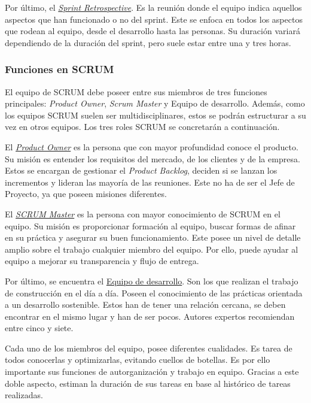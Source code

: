 Por último, el \underline{\textit{Sprint Retrospective}}. Es la reunión donde el equipo indica aquellos aspectos que han funcionado o no del sprint. Este se enfoca en todos los aspectos que rodean al equipo, desde el desarrollo hasta las personas. Su duración variará dependiendo de la duración del sprint, pero suele estar entre una y tres horas.

\subsubsection{Funciones en SCRUM}
El equipo de SCRUM debe poseer entre sus miembros de tres funciones principales: \textit{Product Owner}, \textit{Scrum Master} y Equipo de desarrollo. Además, como los equipos SCRUM suelen ser multidisciplinares, estos se podrán estructurar a su vez en otros equipos. Los tres roles SCRUM se concretarán a continuación.

El \underline{\textit{Product Owner}} es la persona que con mayor profundidad conoce el producto. Su misión es entender los requisitos del mercado, de los clientes y de la empresa. Estos se encargan de gestionar el \textit{Product Backlog}, deciden si se lanzan los incrementos y lideran las mayoría de las reuniones. Este no ha de ser el Jefe de Proyecto, ya que poseen misiones diferentes.

El \underline{\textit{SCRUM Master}} es la persona con mayor conocimiento de SCRUM en el equipo. Su misión es proporcionar formación al equipo, buscar formas de afinar en su práctica y asegurar su buen funcionamiento. Este posee un nivel de detalle amplio sobre el trabajo cualquier miembro del equipo. Por ello, puede ayudar al equipo a mejorar su transparencia y flujo de entrega.

Por último, se encuentra el \underline{Equipo de desarrollo}. Son los que realizan el trabajo de construcción en el día a día. Poseen el conocimiento de las prácticas orientada a un desarrollo sostenible. Estos han de tener una relación cercana, se deben encontrar en el mismo lugar y han de ser pocos. Autores expertos recomiendan entre cinco y siete.

Cada uno de los miembros del equipo, posee diferentes cualidades. Es tarea de todos conocerlas y optimizarlas, evitando cuellos de botellas. Es por ello importante sus funciones de autorganización y trabajo en equipo. Gracias a este doble aspecto, estiman la duración de sus tareas en base al histórico de tareas realizadas.


